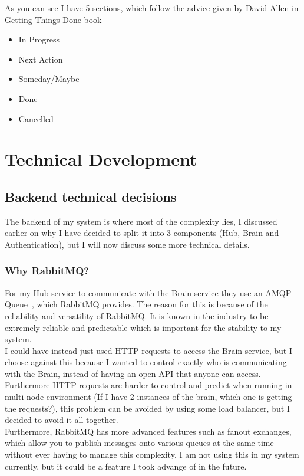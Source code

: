 \documentclass[titlepage]{article}
\begin{document}
As you can see I have 5 sections, which follow the advice given by David Allen in Getting Things Done book~\cite{gtd}

\begin{itemize}
  \item In Progress
  \item Next Action
  \item Someday/Maybe
  \item Done
  \item Cancelled
\end{itemize}

\pagebreak
\section{Technical Development}
\subsection{Backend technical decisions}
The backend of my system is where most of the complexity lies, I discussed earlier on why I have decided to split it into 3 components (Hub, Brain and Authentication), but I will now discuss some more technical details.

\subsubsection{Why RabbitMQ?}
For my Hub service to communicate with the Brain service they use an AMQP Queue~\cite{amqp}, which RabbitMQ provides. The reason for this is because of the reliability and versatility of RabbitMQ. It is known in the industry to be extremely reliable and predictable which is important for the stability to my system. \\

I could have instead just used HTTP requests to access the Brain service, but I choose against this because I wanted to control exactly who is communicating with the Brain, instead of having an open API that anyone can access. Furthermore HTTP requests are harder to control and predict when running in multi-node environment (If I have 2 instances of the brain, which one is getting the requests?), this problem can be avoided by using some load balancer, but I decided to avoid it all together. \\

Furthermore, RabbitMQ has more advanced features such as fanout exchanges, which allow you to publish messages onto various queues at the same time without ever having to manage this complexity, I am not using this in my system currently, but it could be a feature I took advange of in the future.
\end{document}
